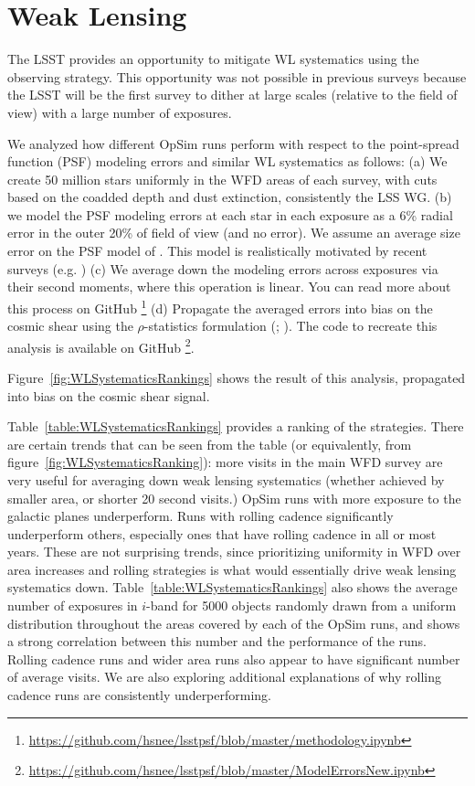 \section{Weak Lensing}\label{sec:wl}

The LSST provides an opportunity to mitigate WL systematics using the observing strategy. This opportunity was not possible in previous surveys because the LSST will be the first survey to dither at large scales (relative to the field of view) with a large number of exposures.

We analyzed how different OpSim runs perform with respect to the point-spread function (PSF) modeling errors and similar WL systematics as follows: (a) We create 50 million stars uniformly in the WFD areas of each survey, with cuts based on the coadded depth and dust extinction, consistently the LSS WG. (b) we model the PSF modeling errors at each star in each exposure as a 6\% radial error in the outer 20\% of field of view (and no error). We assume an average size error on the PSF model of . This model is realistically motivated by recent surveys (e.g. \cite{bosche2018}) (c) We average down the modeling errors across exposures via their second moments, where this operation is linear. You can read more about this process on GitHub \footnote{\url{https://github.com/hsnee/lsstpsf/blob/master/methodology.ipynb}} (d) Propagate the averaged errors into bias on the cosmic shear using the $\rho$-statistics formulation (\cite{rowe2010}; \cite{jarvis2016}). The code to recreate this analysis is available on GitHub \footnote{\url{https://github.com/hsnee/lsstpsf/blob/master/ModelErrorsNew.ipynb}}. 

Figure~\ref{fig:WLSystematicsRankings} shows the result of this analysis, propagated into bias on the cosmic shear signal. 

Table~\ref{table:WLSystematicsRankings} provides a ranking of the strategies. There are certain trends that can be seen from the table (or equivalently, from figure~\ref{fig:WLSystematicsRanking}): more visits in the main WFD survey are very useful for averaging down weak lensing systematics (whether achieved by smaller area, or shorter 20 second visits.) OpSim runs with more exposure to the galactic planes underperform. Runs with rolling cadence significantly underperform others, especially ones that have rolling cadence in all or most years. These are not surprising trends, since prioritizing uniformity in WFD over area increases and rolling strategies is what would essentially drive weak lensing systematics down. Table~\ref{table:WLSystematicsRankings} also shows the average number of exposures in $i$-band for 5000 objects randomly drawn from a uniform distribution throughout the areas covered by each of the OpSim runs, and shows a strong correlation between this number and the performance of the runs. Rolling cadence runs and wider area runs also appear to have significant number of average visits. We are also exploring additional explanations of why rolling cadence runs are consistently underperforming.


